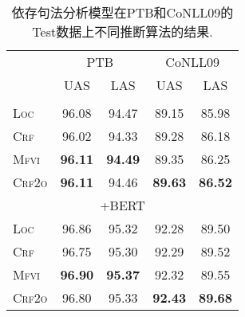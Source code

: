 \begin{table}[tb!]
  \centering
  \caption{依存句法分析模型在PTB和CoNLL09的Test数据上不同推断算法的结果.}
  \begin{tabular}{lcccc}
    \toprule
                   & \multicolumn{2}{c}{PTB} & \multicolumn{2}{c}{CoNLL09}                                   \\
                   & UAS                     & LAS                         & UAS            & LAS            \\[2pt]
    \midrule
    \\[-15pt]
    \textsc{Loc}   & 96.08                   & 94.47                       & 89.15          & 85.98          \\
    \textsc{Crf}   & 96.02                   & 94.33                       & 89.28          & 86.18          \\
    \textsc{Mfvi}  & \textbf{96.11}          & \textbf{94.49}              & 89.35          & 86.25          \\
    \textsc{Crf2o} & \textbf{96.11}          & 94.46                       & \textbf{89.63} & \textbf{86.52} \\
    \multicolumn{5}{c}{+BERT}                                                                                \\[3pt]
    \textsc{Loc}   & 96.86                   & 95.32                       & 92.28          & 89.50          \\
    \textsc{Crf}   & 96.75                   & 95.30                       & 92.29          & 89.52          \\
    \textsc{Mfvi}  & \textbf{96.90}          & \textbf{95.37}              & 92.32          & 89.55          \\
    \textsc{Crf2o} & 96.80                   & 95.33                       & \textbf{92.43} & \textbf{89.68} \\
    \bottomrule
  \end{tabular}
  \label{table:vi-dep-test}
\end{table}


